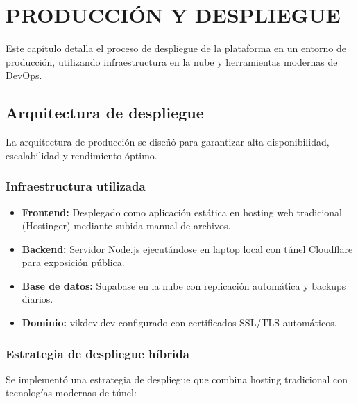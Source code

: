 \documentclass[12pt,a4paper]{report}
\begin{document}
\chapter{PRODUCCIÓN Y DESPLIEGUE}

Este capítulo detalla el proceso de despliegue de la plataforma en un entorno de producción, utilizando infraestructura en la nube y herramientas modernas de DevOps.

\section{Arquitectura de despliegue}

La arquitectura de producción se diseñó para garantizar alta disponibilidad, escalabilidad y rendimiento óptimo.

\subsection{Infraestructura utilizada}

\begin{itemize}
\item \textbf{Frontend:} Desplegado como aplicación estática en hosting web tradicional (Hostinger) mediante subida manual de archivos.
\item \textbf{Backend:} Servidor Node.js ejecutándose en laptop local con túnel Cloudflare para exposición pública.
\item \textbf{Base de datos:} Supabase en la nube con replicación automática y backups diarios.
\item \textbf{Dominio:} vikdev.dev configurado con certificados SSL/TLS automáticos.
\end{itemize}

\subsection{Estrategia de despliegue híbrida}

Se implementó una estrategia de despliegue que combina hosting tradicional con tecnologías modernas de túnel:
\end{document}
